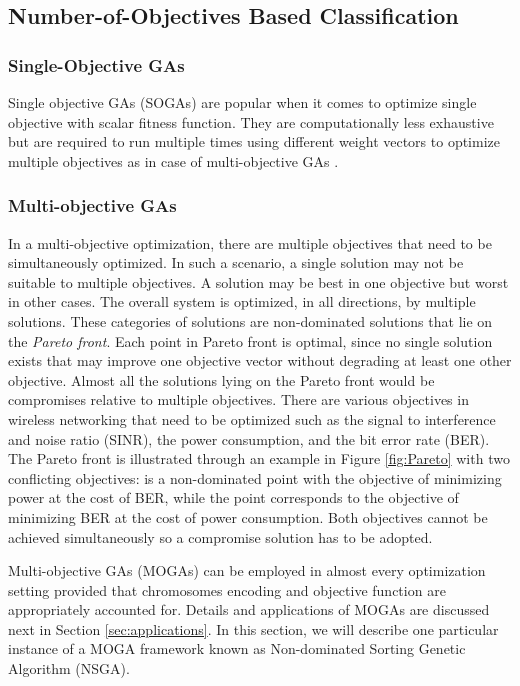 \documentclass[journal]{IEEEtran}
\begin{document}
\subsection{Number-of-Objectives Based Classification}

\vspace{2mm}
\subsubsection{Single-Objective GAs}

Single objective GAs (SOGAs) are popular when it comes to optimize single objective with scalar fitness function. They are computationally less exhaustive but are required to run multiple times using different weight vectors to optimize multiple objectives as in case of multi-objective GAs \cite{ishibuchi2006comparison}. 



\vspace{2mm}
\subsubsection{Multi-objective GAs}

In a multi-objective optimization, there are multiple objectives that need to be  simultaneously optimized. In such a scenario, a single solution may not be suitable to multiple objectives. A solution may be best in one objective but worst in other cases. The overall system is optimized, in all directions, by multiple solutions. These categories of solutions are non-dominated solutions that lie on the \emph{Pareto front}. Each point in Pareto front is optimal, since no single solution exists that may improve one objective vector without degrading at least one other objective. Almost all the solutions lying on the Pareto front would be compromises relative to multiple objectives. There are various objectives in wireless networking that need to be optimized such as the signal to interference and noise ratio (SINR), the power consumption, and the bit error rate (BER). The Pareto front is illustrated through an example in Figure \ref{fig:Pareto} with two conflicting objectives:  is a non-dominated point with the objective of minimizing power at the cost of BER, while the point  corresponds to the objective of minimizing BER at the cost of power consumption. Both objectives cannot be achieved simultaneously so a compromise solution has to be adopted.

Multi-objective GAs (MOGAs) can be employed in almost every optimization setting   provided that chromosomes encoding and objective function are appropriately accounted for. Details and applications of MOGAs are discussed next in Section \ref{sec:applications}. In this section, we will describe one particular instance of a MOGA framework known as Non-dominated Sorting Genetic Algorithm (NSGA).
\end{document}
